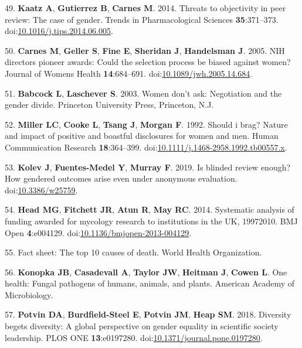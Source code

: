 \documentclass[11pt,]{article}
\begin{document}
\hypertarget{ref-Kaatz2014}{}
49. \textbf{Kaatz A}, \textbf{Gutierrez B}, \textbf{Carnes M}. 2014.
Threats to objectivity in peer review: The case of gender. Trends in
Pharmacological Sciences \textbf{35}:371--373.
doi:\href{https://doi.org/10.1016/j.tips.2014.06.005}{10.1016/j.tips.2014.06.005}.

\hypertarget{ref-Carnes2005}{}
50. \textbf{Carnes M}, \textbf{Geller S}, \textbf{Fine E},
\textbf{Sheridan J}, \textbf{Handelsman J}. 2005. NIH directors pioneer
awards: Could the selection process be biased against women? Journal of
Womens Health \textbf{14}:684--691.
doi:\href{https://doi.org/10.1089/jwh.2005.14.684}{10.1089/jwh.2005.14.684}.

\hypertarget{ref-babcock_women_2003}{}
51. \textbf{Babcock L}, \textbf{Laschever S}. 2003. Women don't ask:
Negotiation and the gender divide. Princeton University Press,
Princeton, N.J.

\hypertarget{ref-MILLER1992}{}
52. \textbf{Miller LC}, \textbf{Cooke L}, \textbf{Tsang J},
\textbf{Morgan F}. 1992. Should i brag? Nature and impact of positive
and boastful disclosures for women and men. Human Communication Research
\textbf{18}:364--399.
doi:\href{https://doi.org/10.1111/j.1468-2958.1992.tb00557.x}{10.1111/j.1468-2958.1992.tb00557.x}.

\hypertarget{ref-Kolev2019}{}
53. \textbf{Kolev J}, \textbf{Fuentes-Medel Y}, \textbf{Murray F}. 2019.
Is blinded review enough? How gendered outcomes arise even under
anonymous evaluation.
doi:\href{https://doi.org/10.3386/w25759}{10.3386/w25759}.

\hypertarget{ref-Head2014}{}
54. \textbf{Head MG}, \textbf{Fitchett JR}, \textbf{Atun R}, \textbf{May
RC}. 2014. Systematic analysis of funding awarded for mycology research
to institutions in the UK, 19972010. BMJ Open \textbf{4}:e004129.
doi:\href{https://doi.org/10.1136/bmjopen-2013-004129}{10.1136/bmjopen-2013-004129}.

\hypertarget{ref-WHO_2018}{}
55. Fact sheet: The top 10 causes of death. World Health Organization.

\hypertarget{ref-ASM_2019}{}
56. \textbf{Konopka JB}, \textbf{Casadevall A}, \textbf{Taylor JW},
\textbf{Heitman J}, \textbf{Cowen L}. One health: Fungal pathogens of
humans, animals, and plants. American Academy of Microbiology.

\hypertarget{ref-potvin_diversity_2018}{}
57. \textbf{Potvin DA}, \textbf{Burdfield-Steel E}, \textbf{Potvin JM},
\textbf{Heap SM}. 2018. Diversity begets diversity: A global perspective
on gender equality in scientific society leadership. PLOS ONE
\textbf{13}:e0197280.
doi:\href{https://doi.org/10.1371/journal.pone.0197280}{10.1371/journal.pone.0197280}.
\end{document}
